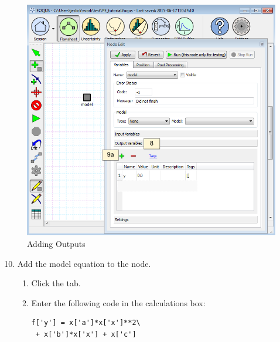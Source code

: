\begin{figure}[H]
	\begin{center}
		\includegraphics[scale=0.55]{Chapt_optimization/figs/par_est_tut3}
		\caption{Adding Outputs}
		\label{fig.pe.tut3}
	\end{center}
\end{figure}

\begin{enumerate}
	\setcounter{enumi}{9}
	\item Add the model equation to the node.
	\begin{enumerate}
		\item Click the  tab.
		\item Enter the following code in the calculations box:
		\begin{Verbatim}
f['y'] = x['a']*x['x']**2\
 + x['b']*x['x'] + x['c']
		\end{Verbatim}
	\end{enumerate}
\end{enumerate}

